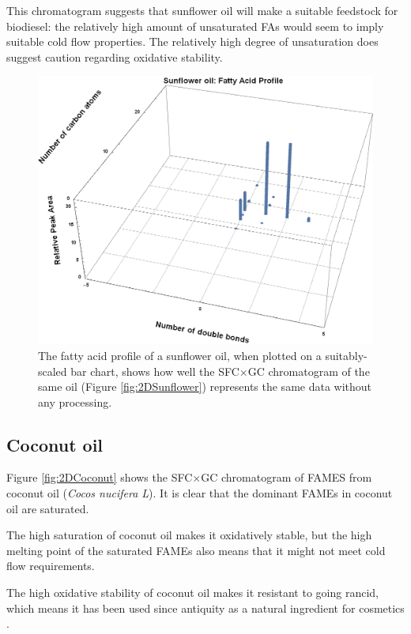 This chromatogram suggests that sunflower oil will make a suitable feedstock for
biodiesel: the relatively high amount of unsaturated FAs would seem to imply
suitable cold flow properties. The relatively high degree of unsaturation does
suggest caution regarding oxidative stability.

\begin{figure}
\centering
\includegraphics[width=\textwidth]{Figures/BarChart.png}
\decoRule

\caption[3D Bar chart of fatty acid profile]{The fatty acid profile of a
sunflower oil, when plotted on a suitably-scaled bar chart, shows how well the
SFC×GC chromatogram of the same oil (Figure \ref{fig:2DSunflower}) represents
the same data without any processing.}

\label{fig:2DSunflowerBarChart}
\end{figure}

\subsection{Coconut oil}

Figure \ref{fig:2DCoconut} shows the SFC×GC chromatogram of FAMES from coconut
oil (\textit{Cocos nucifera L}). It is clear that the dominant FAMEs in coconut
oil are saturated.

The high saturation of coconut oil makes it oxidatively stable, but the high
melting point of the saturated FAMEs also means that it might not meet
cold flow requirements.

The high oxidative stability of coconut oil makes it resistant to going rancid,
which means it has been used since antiquity as a natural ingredient for cosmetics
\autocite{Berdick1972}.

